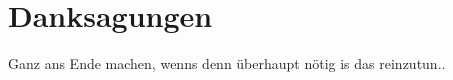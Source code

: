 




\begingroup
\let\clearpage\relax
\let\cleardoublepage\relax
\let\cleardoublepage\relax
\chapter*{Danksagungen}


Ganz ans Ende machen, wenns denn überhaupt nötig is das reinzutun..

\bigskip




\endgroup



